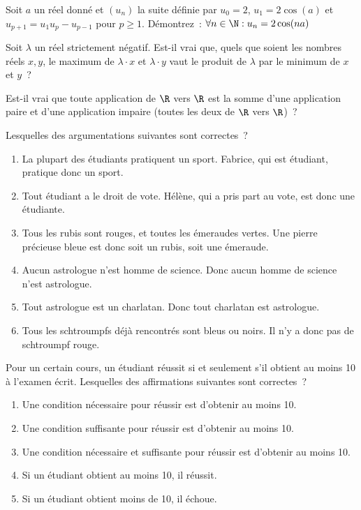 \documentclass[12pt,french,oneside,a4paper]{memoir} %
\begin{document}
\begin{exo}
Soit $a$ un réel donné et $(u_n)$ la suite définie par $u_0=2$,
$u_1=2\cos (a)$ et $u_{p+1}=u_1u_p-u_{p-1}$ pour $p\geq 1$.  Démontrez~:
$\forall n\in \N:u_n=2\cos (na)$
\end{exo}

\begin{exo}
Soit $\lambda$ un réel strictement négatif. Est-il vrai que, quels que
soient les nombres réels $x,y$,  le maximum de $\lambda \cdot x$ et $\lambda
\cdot y$ vaut le produit de $\lambda$ par le minimum de $x$ et $y$~?
\end{exo}

\begin{exo}
Est-il vrai que toute application de $\R$ vers $\R$ est la somme d'une
application paire et d'une application impaire (toutes les deux de $\R$ vers
$\R$)~?
\end{exo}

\begin{exo}
Lesquelles des argumentations suivantes sont correctes~?
\begin{enumerate}
\item La plupart des étudiants pratiquent un sport. Fabrice, qui est
étudiant, pratique donc un sport.
\item Tout étudiant a le droit de vote. Hélène, qui a pris part au vote,
est donc une étudiante.
\item Tous les rubis sont rouges, et toutes les émeraudes vertes. Une pierre
précieuse bleue est donc soit un rubis, soit une émeraude. 
\item Aucun astrologue n'est homme de science. Donc aucun homme de science n'est
astrologue. 
\item Tout astrologue est un charlatan. Donc tout charlatan est astrologue.
\item Tous les schtroumpfs déjà rencontrés sont bleus ou noirs. Il n'y a
donc pas de schtroumpf rouge.
\end{enumerate}
\end{exo}

\begin{exo}
Pour un certain cours, un étudiant réussit si et seulement s'il obtient
au moins 10 à l'examen écrit. Lesquelles des affirmations suivantes sont
correctes~? 
\begin{enumerate}
\item Une condition nécessaire pour réussir est d'obtenir au moins 10.
\item Une condition suffisante pour réussir est d'obtenir au moins 10.
\item Une condition nécessaire et suffisante pour réussir est d'obtenir au
moins 10.
\item Si un étudiant obtient au moins 10, il réussit. 
\item Si un étudiant obtient moins de 10, il échoue.
\end{enumerate}
\end{exo}
\end{document}
